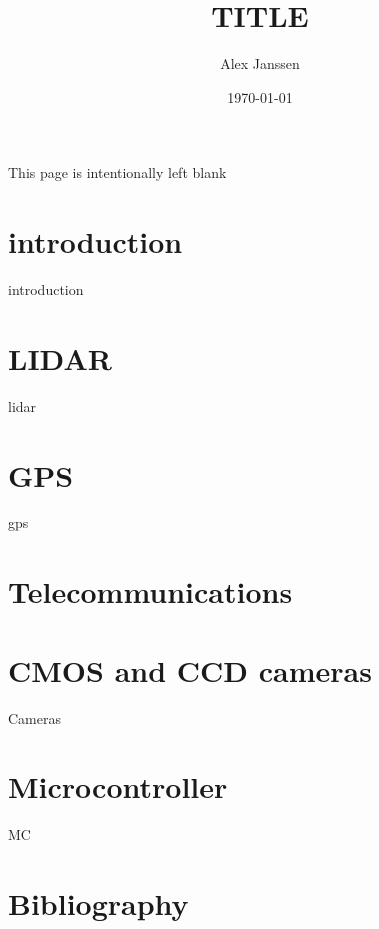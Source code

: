 \documentclass[parskip=full,11pt,a4paper,titlepage]{article}
\title{TITLE}
\author{Alex Janssen}
\date{\today}
\begin{document}



\clearpage

\begin{center}
This page is intentionally left blank
\end{center}
\clearpage



\tableofcontents
\clearpage

\section{introduction}
{introduction}
\clearpage

\section{LIDAR}
{lidar}
\clearpage

\section{GPS}
{gps}
\clearpage

\section{Telecommunications}

\section{CMOS and CCD cameras}
{Cameras}
\clearpage

\section{Microcontroller}
{MC}
\clearpage

\section{Bibliography}








\end{document}
